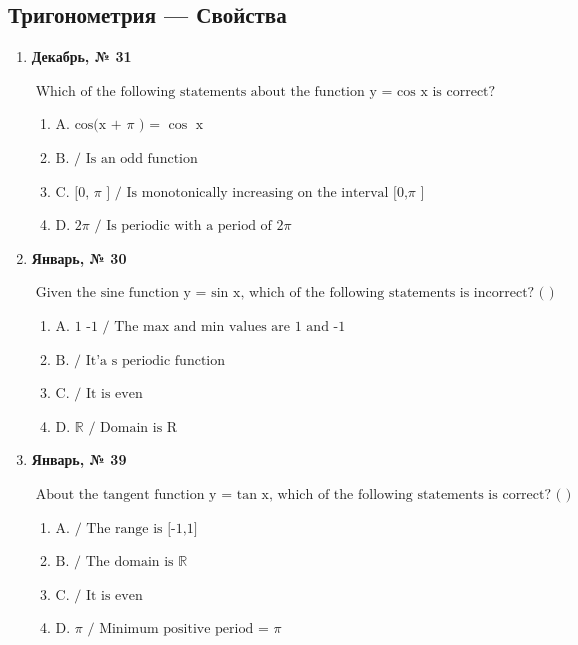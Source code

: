 \subsection*{Тригонометрия — Свойства}
\begin{enumerate}
\item \textbf{Декабрь, № 31} \par \smallskip
$\displaystyle \text{Which of the following statements about the function y = }\cos\text{ x is correct?}$
\begin{enumerate}
\item $\displaystyle \text{A. cos(x + }\pi\text{ ) = }\cos\text{ x}$
\item $\displaystyle \text{B.  / Is an odd function}$
\item $\displaystyle \text{C.  [0, }\pi\text{ ]  / Is monotonically increasing on the interval [0,}\pi\text{ ]}$
\item $\displaystyle \text{D.  2}\pi\text{   / Is periodic with a period of 2}\pi\text{ }$
\end{enumerate}
\item \textbf{Январь, № 30} \par \smallskip
$\displaystyle \text{Given the sine function y = }\sin\text{ x, which of the following statements is incorrect? ( )}$
\begin{enumerate}
\item $\displaystyle \text{A.  1  -1 / ​The max and min values are 1 and -1}$
\item $\displaystyle \text{B.  / It'a s periodic function}$
\item $\displaystyle \text{C.  / It is even}$
\item $\displaystyle \text{D.  }\mathbb{R}\text{ / ​Domain is R​}$
\end{enumerate}
\item \textbf{Январь, № 39} \par \smallskip
$\displaystyle \text{About the tangent function y = }\tan\text{ x, which of the following statements is correct? ( )}$
\begin{enumerate}
\item $\displaystyle \text{A.  / The  range is [-1,1]}$
\item $\displaystyle \text{B.  / The domain is }\mathbb{R}$
\item $\displaystyle \text{C.  / It is even}$
\item $\displaystyle \text{D.  }\pi\text{  / ​Minimum positive period = }\pi\text{ }$
\end{enumerate}
\end{enumerate}

